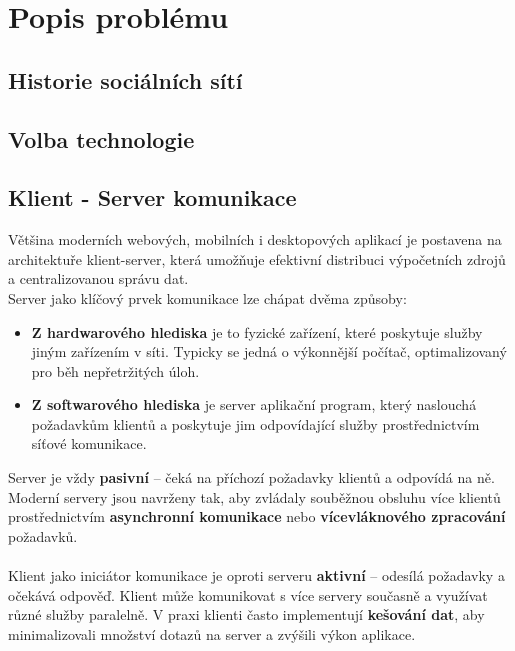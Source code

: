 \newpage

\section{Popis problému}


\subsection{Historie sociálních sítí}



\subsection{Volba technologie}

\subsection{Klient - Server komunikace}

Většina moderních webových, mobilních i desktopových aplikací je postavena na architektuře klient-server, která umožňuje efektivní distribuci výpočetních zdrojů a centralizovanou správu dat. \\
Server jako klíčový prvek komunikace lze chápat dvěma způsoby:
\begin{itemize}
    \item \textbf{Z hardwarového hlediska} je to fyzické zařízení, které poskytuje služby jiným zařízením v síti. Typicky se jedná o výkonnější počítač, optimalizovaný pro běh nepřetržitých úloh.
    \item \textbf{Z softwarového hlediska} je server aplikační program, který naslouchá požadavkům klientů a poskytuje jim odpovídající služby prostřednictvím síťové komunikace.
\end{itemize}
Server je vždy \textbf{pasivní} – čeká na příchozí požadavky klientů a odpovídá na ně. Moderní servery jsou navrženy tak, aby zvládaly souběžnou obsluhu více klientů prostřednictvím \textbf{asynchronní komunikace} nebo \textbf{vícevláknového zpracování} požadavků.\\\\
Klient jako iniciátor komunikace je oproti serveru \textbf{aktivní} – odesílá požadavky a očekává odpověď. Klient může komunikovat s více servery současně a využívat různé služby paralelně. V praxi klienti často implementují \textbf{kešování dat}, aby minimalizovali množství dotazů na server a zvýšili výkon aplikace.

